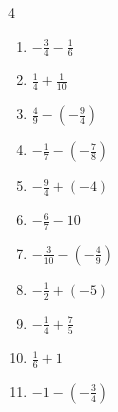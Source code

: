 \begin{multicols}{4}
\begin{enumerate}

  \item $\displaystyle -\frac{3}{4} - \frac{1}{6}$


  \item $\displaystyle \frac{1}{4} + \frac{1}{10}$


  \item $\displaystyle \frac{4}{9} - \left(-\frac{9}{4}\right)$


  \item $\displaystyle -\frac{1}{7} - \left(-\frac{7}{8}\right)$


  \item $\displaystyle -\frac{9}{4} + \left(-4\right)$


  \item $\displaystyle -\frac{6}{7} - 10$


\columnbreak %

  \item $\displaystyle -\frac{3}{10} - \left(-\frac{4}{9}\right)$


  \item $\displaystyle -\frac{1}{2} + \left(-5\right)$


  \item $\displaystyle -\frac{1}{4} + \frac{7}{5}$


  \item $\displaystyle \frac{1}{6} + 1$


  \item $\displaystyle -1 - \left(-\frac{3}{4}\right)$



\end{enumerate}
\end{multicols}
